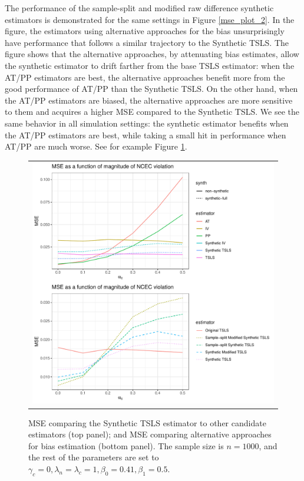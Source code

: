 \documentclass{article}
\begin{document}
%
The performance of the sample-split and modified raw difference synthetic estimators is demonstrated for the same settings in Figure \ref{mse_plot_2}. In the figure, the estimators using alternative approaches for the bias unsurprisingly have performance that follows a similar trajectory to the Synthetic TSLS. The figure shows that the alternative approaches, by attenuating bias estimates, allow the synthetic estimator to drift farther from the base TSLS estimator: when the AT/PP estimators are best, the alternative approaches benefit more from the good performance of AT/PP than the Synthetic TSLS. On the other hand, when the AT/PP estimators are biased, the alternative approaches are more sensitive to them and acquires a higher MSE compared to the Synthetic TSLS. We see the same behavior in all simulation settings: the synthetic estimator benefits when the AT/PP estimators are best, while taking a small hit in performance when AT/PP are much worse. See for example Figure \ref{mse_plot_3}.

\begin{figure}
\centering
\begin{tabular}{c}
\includegraphics[width =\textwidth]{figures/additional-mse-plot.pdf}
\end{tabular}\vspace{0.2in}
\caption{MSE comparing the Synthetic TSLS estimator to other candidate estimators (top panel); and MSE comparing alternative approaches for bias estimation (bottom panel). The sample size is $n = 1000$, and the rest of the parameters are set to $\gamma_c = 0, \lambda_n = \lambda_c = 1, \beta_0 = 0.41, \beta_1 = 0.5$.}\label{mse_plot_3}
\end{figure}



\end{document}
